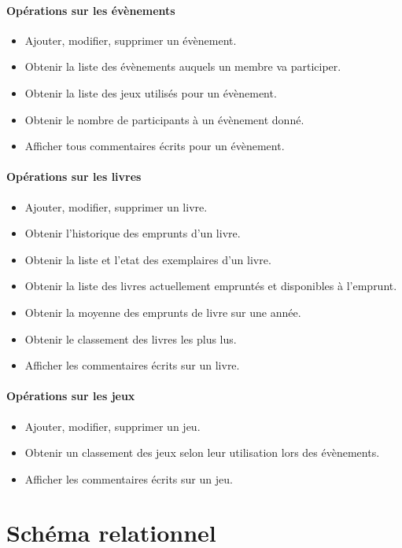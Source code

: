 \documentclass[a4paper, 11pt]{article}
\begin{document}
\subsection{Opérations sur les évènements}
\begin{itemize}
\item Ajouter, modifier, supprimer un évènement.
\item Obtenir la liste des évènements auquels un membre va participer.
\item Obtenir la liste des jeux utilisés pour un évènement.
\item Obtenir le nombre de participants à un évènement donné.
\item Afficher tous commentaires écrits pour un évènement.
\end{itemize}
\subsection{Opérations sur les livres}
\begin{itemize}
\item Ajouter, modifier, supprimer un livre.
\item Obtenir l'historique des emprunts d'un livre.
\item Obtenir la liste et l'etat des exemplaires d'un livre.
\item Obtenir la liste des livres actuellement empruntés et disponibles à l'emprunt.
\item Obtenir la moyenne des emprunts de livre sur une année.
\item Obtenir le classement des livres les plus lus.
\item Afficher les commentaires écrits sur un livre.
\end{itemize}
\subsection{Opérations sur les jeux}
\begin{itemize}
\item Ajouter, modifier, supprimer un jeu.
\item Obtenir un classement des jeux selon leur utilisation lors des évènements.
\item Afficher les commentaires écrits sur un jeu.
\end{itemize}

\newpage
\part{Schéma relationnel}
\setcounter{section}{0}
\end{document}
